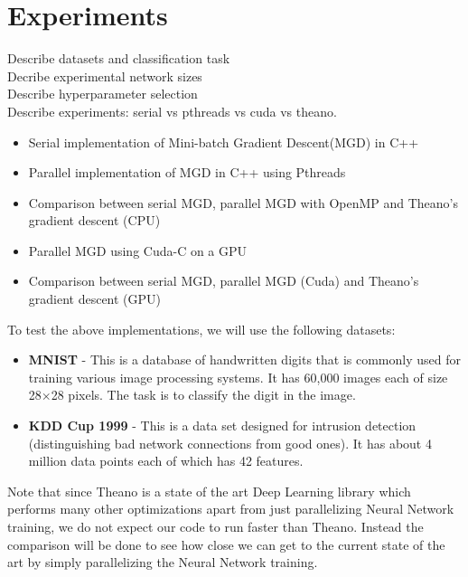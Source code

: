\section{Experiments}
\label{Exp}

Describe datasets and classification task \\
Decribe experimental network sizes \\
Describe hyperparameter selection \\
Describe experiments: serial vs pthreads vs cuda vs theano.

\begin{itemize}
    \item Serial implementation of Mini-batch Gradient Descent(MGD) in C++
    \item Parallel implementation of MGD in C++ using Pthreads
    \item Comparison between serial MGD, parallel MGD with OpenMP and Theano's gradient descent (CPU)
    \item Parallel MGD using Cuda-C on a GPU
    \item Comparison between serial MGD, parallel MGD (Cuda) and Theano's gradient descent (GPU)
\end{itemize}

To test the above implementations, we will use the following datasets: 
\begin{itemize}
    \item \textbf{MNIST} - This is a database of handwritten digits that is commonly used for training various image processing systems. It has 60,000 images each of size 28$\times$28 pixels. The task is to classify the digit in the image. 
    \item \textbf{KDD Cup 1999} - This is a data set designed for intrusion detection (distinguishing bad network connections from good ones). It has about 4 million data points each of which has 42 features.  
\end{itemize}

Note that since Theano is a state of the art Deep Learning library which performs many other optimizations apart from just parallelizing Neural Network training, we do not expect our code to run faster than Theano. Instead the comparison will be done to see how close we can get to the current state of the art by simply parallelizing the Neural Network training.